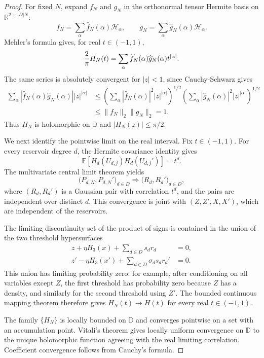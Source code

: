 \documentclass[11pt]{article}
\newcommand{\R}{\mathbb R}
\newcommand{\D}{\mathbb D}
\newcommand{\E}{\mathbb E}
\newcommand{\1}{\mathbf 1}
\theoremstyle{plain}
\theoremstyle{definition}
\theoremstyle{remark}
\begin{document}
\begin{proof}
For fixed \(N\), expand \(f_N\) and \(g_N\) in the orthonormal tensor Hermite basis on \(\R^{2+|D|N}\):
\[
  f_N=\sum_\alpha \widehat f_N(\alpha)\mathcal H_\alpha,
  \qquad
  g_N=\sum_\alpha \widehat g_N(\alpha)\mathcal H_\alpha.
\]
Mehler's formula gives, for real \(t\in(-1,1)\),
\[
  {2\over\pi}H_N(t)=\sum_\alpha \widehat f_N(\alpha)\widehat g_N(\alpha)t^{|\alpha|}.
\]
The same series is absolutely convergent for \(|z|<1\), since Cauchy-Schwarz gives
\begin{align*}
  \sum_\alpha |\widehat f_N(\alpha)\widehat g_N(\alpha)| |z|^{|\alpha|}
  &\le
  \left(\sum_\alpha |\widehat f_N(\alpha)|^2 |z|^{|\alpha|}\right)^{1/2}
  \left(\sum_\alpha |\widehat g_N(\alpha)|^2 |z|^{|\alpha|}\right)^{1/2}\\
  &\le \|f_N\|_2\|g_N\|_2=1.
\end{align*}
Thus \(H_N\) is holomorphic on \(\D\) and \(|H_N(z)|\le \pi/2\).

We next identify the pointwise limit on the real interval.  Fix \(t\in(-1,1)\).  For every reservoir degree \(d\), the Hermite covariance identity gives
\[
  \E[H_d(U_{d,j})H_d(U_{d,j}')]=t^d.
\]
The multivariate central limit theorem yields
\[
  \bigl(P_{d,N},P_{d,N}'\bigr)_{d\in D}
  \Rightarrow
  \bigl(R_d,R_d'\bigr)_{d\in D},
\]
where \((R_d,R_d')\) is a Gaussian pair with correlation \(t^d\), and the pairs are independent over distinct \(d\).  This convergence is joint with \((Z,Z',X,X')\), which are independent of the reservoirs.

The limiting discontinuity set of the product of signs is contained in the union of the two threshold hypersurfaces
\begin{align*}
  z+\eta H_3(x)+\sum_{d\in D}s_dr_d&=0,\\
  z'-\eta H_3(x')+\sum_{d\in D}\sigma_ds_dr_d'&=0.
\end{align*}
This union has limiting probability zero: for example, after conditioning on all variables except \(Z\), the first threshold has probability zero because \(Z\) has a density, and similarly for the second threshold using \(Z'\).  The bounded continuous mapping theorem therefore gives \(H_N(t)\to H(t)\) for every real \(t\in(-1,1)\).

The family \(\{H_N\}\) is locally bounded on \(\D\) and converges pointwise on a set with an accumulation point.  Vitali's theorem gives locally uniform convergence on \(\D\) to the unique holomorphic function agreeing with the real limiting correlation.  Coefficient convergence follows from Cauchy's formula.
\end{proof}
\end{document}
